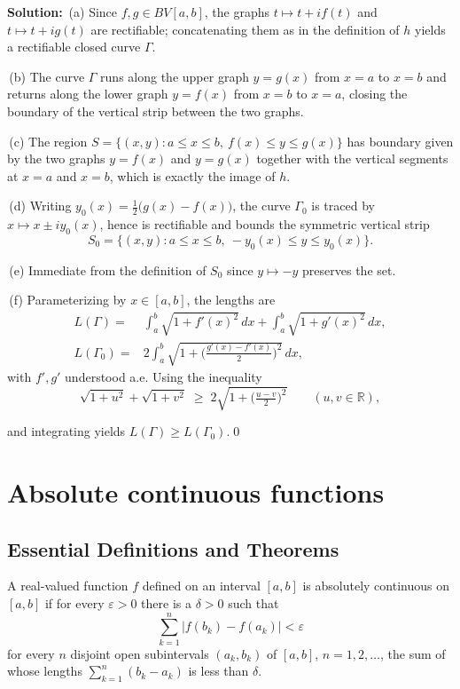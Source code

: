 \bigskip\noindent\textbf{Solution:}
\,(a) Since $f,g\in BV[a,b]$, the graphs $t\mapsto t+if(t)$ and $t\mapsto t+ig(t)$ are rectifiable; concatenating them as in the definition of $h$ yields a rectifiable closed curve $\Gamma$.

\,(b) The curve $\Gamma$ runs along the upper graph $y=g(x)$ from $x=a$ to $x=b$ and returns along the lower graph $y=f(x)$ from $x=b$ to $x=a$, closing the boundary of the vertical strip between the two graphs.

\,(c) The region $S=\{(x,y): a\le x\le b,\ f(x)\le y\le g(x)\}$ has boundary given by the two graphs $y=f(x)$ and $y=g(x)$ together with the vertical segments at $x=a$ and $x=b$, which is exactly the image of $h$.

\,(d) Writing $y_0(x)=\tfrac12\big(g(x)-f(x)\big)$, the curve $\Gamma_0$ is traced by $x\mapsto x\pm i y_0(x)$, hence is rectifiable and bounds the symmetric vertical strip
\[S_0=\{(x,y): a\le x\le b,\ -y_0(x)\le y\le y_0(x)\}.\]

\,(e) Immediate from the definition of $S_0$ since $y\mapsto -y$ preserves the set.

\,(f) Parameterizing by $x\in[a,b]$, the lengths are
\begin{align*}
L(\Gamma)=&\int_a^b\!\sqrt{1+f'(x)^2}\,dx+\int_a^b\!\sqrt{1+g'(x)^2}\,dx,\\
L(\Gamma_0)=&2\int_a^b\!\sqrt{1+\Big(\tfrac{g'(x)-f'(x)}{2}\Big)^{\!2}}\,dx,
\end{align*}
with $f',g'$ understood a.e. Using the inequality
\[\sqrt{1+u^2}+\sqrt{1+v^2}\;\ge\;2\sqrt{1+\Big(\tfrac{u-v}{2}\Big)^{\!2}}\qquad(u,v\in\mathbb{R}),\]

and integrating yields $L(\Gamma)\ge L(\Gamma_0)$.\qed
\section{Absolute continuous functions}

\subsection*{Essential Definitions and Theorems}

\begin{definition}
A real-valued function $f$ defined on an interval $[a,b]$ is absolutely continuous on $[a,b]$ if for every $\varepsilon > 0$ there is a $\delta > 0$ such that
\[\sum_{k=1}^{n} |f(b_k) - f(a_k)| < \varepsilon\]
for every $n$ disjoint open subintervals $(a_k, b_k)$ of $[a, b]$, $n = 1, 2, \ldots$, the sum of whose lengths $\sum_{k=1}^{n} (b_k - a_k)$ is less than $\delta$.
\end{definition}


